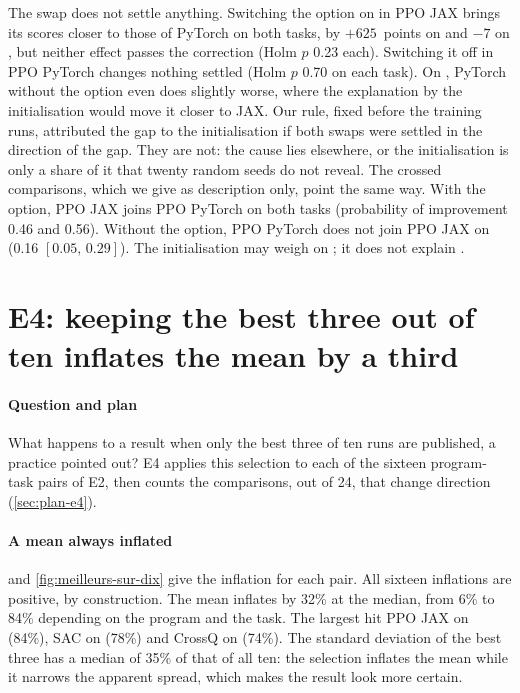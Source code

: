 The swap does not settle anything. Switching the option on in PPO JAX brings its scores closer to those of
PyTorch on both tasks, by $+625$~points on  and $-7$ on , but neither effect passes
the correction (Holm $p$ 0.23 each). Switching it off in PPO PyTorch changes nothing settled (Holm $p$ 0.70 on
each task). On , PyTorch without the option even does slightly worse, where the explanation by
the initialisation would move it closer to JAX. Our rule, fixed before the training runs, attributed the gap to
the initialisation if both swaps were settled in the direction of the gap. They are not: the cause lies
elsewhere, or the initialisation is only a share of it that twenty random seeds do not reveal. The crossed
comparisons, which we give as description only, point the same way. With the option, PPO JAX joins PPO
PyTorch on both tasks (probability of improvement 0.46 and 0.56). Without the option, PPO PyTorch does not
join PPO JAX on  (0.16 $[0.05,\,0.29]$). The initialisation may weigh on ; it does
not explain . 

\section{E4: keeping the best three out of ten inflates the mean by a third}\label{sec:e4}

\paragraph{Question and plan}
What happens to a result when only the best three of ten runs are published, a practice
\textcite{henderson2018matters} pointed out? E4 applies this selection to each of the sixteen program-task
pairs of E2, then counts the comparisons, out of 24, that change direction (\cref{sec:plan-e4}).

\paragraph{A mean always inflated}
 and \cref{fig:meilleurs-sur-dix} give the inflation for each pair. All sixteen inflations are
positive, by construction. The mean inflates by 32\% at the median, from 6\% to 84\% depending on the program
and the task. The largest hit PPO JAX on  (84\%), SAC on  (78\%) and CrossQ on
 (74\%). The standard deviation of the best three has a median of 35\% of that of all ten:
the selection inflates the mean while it narrows the apparent spread, which makes the result look more
certain.

